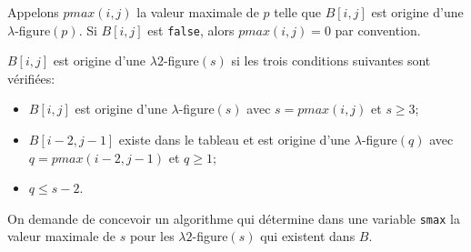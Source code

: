 \documentclass[a4paper,10pt]{article}
\begin{document}
Appelons $pmax(i,j)$ la valeur maximale de $p$ telle que $B[i,j]$ est origine d'une $\lambda$-figure$(p)$. Si $B[i,j]$ est \texttt{false}, alors $pmax(i,j)=0$ par convention.

$B[i,j]$ est origine d'une $\lambda 2$-figure$(s)$ si les trois conditions suivantes sont vérifiées:
\begin{itemize}
\item $B[i,j]$ est origine d'une $\lambda$-figure$(s)$ avec $s=pmax(i,j)$ et $s\geq3$;
\item $B[i-2,j-1]$ existe dans le tableau et est origine d'une $\lambda$-figure$(q)$ avec $q=pmax(i-2,j-1)$ et $q\geq1$;
\item $q \leq s-2$.
\end{itemize}

On demande de concevoir un algorithme qui détermine  dans une variable \texttt{smax} la valeur maximale de $s$ pour les $\lambda 2$-figure$(s)$ qui existent dans $B$.





\end{document}
